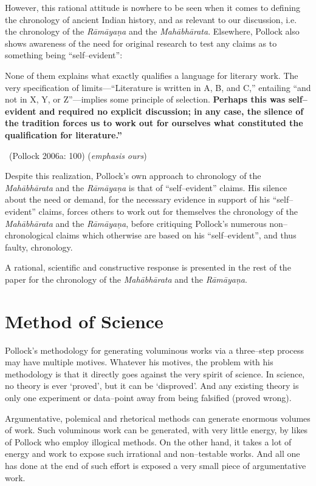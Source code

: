 However, this rational attitude is nowhere to be seen when it comes to defining the chronology of ancient Indian history, and as relevant to our discussion, i.e. the chronology of the \textit{Rāmāyaṇa} and the \textit{Mahābhārata}. Elsewhere, Pollock also shows awareness of the need for original research to test any claims as to something being “self–evident”:

\begin{myquote}
None of them explains what exactly qualiﬁes a language for literary work. The very speciﬁcation of limits—“Literature is written in A, B, and C,” entailing “and not in X, Y, or Z”—implies some principle of selection. \textbf{Perhaps this was self–evident and required no explicit discussion; in any case, the silence of the tradition forces us to work out for ourselves what constituted the qualiﬁcation for literature.”} 

~\hfill (Pollock 2006a: 100) (\textit{emphasis ours})
\end{myquote}

Despite this realization, Pollock’s own approach to chronology of the \textit{Mahābhārata} and the \textit{Rāmāyaṇa} is that of “self–evident” claims. His silence about the need or demand, for the necessary evidence in support of his “self–evident” claims, forces others to work out for themselves the chronology of the \textit{Mahābhārata} and the \textit{Rāmāyaṇa}, before critiquing Pollock’s numerous non–chronological claims which otherwise are based on his “self–evident”, and thus faulty, chronology.

A rational, scientific and constructive response is presented in the rest of the paper for the chronology of the \textit{Mahābhārata} and the \textit{Rāmāyaṇa}.


\section*{Method of Science}

Pollock’s methodology for generating voluminous works via a three–step process may have multiple motives. Whatever his motives, the problem with his methodology is that it directly goes against the very spirit of science. In science, no theory is ever ‘proved’, but it can be ‘disproved’. And any existing theory is only one experiment or data–point away from being falsified (proved wrong).

Argumentative, polemical and rhetorical methods can generate enormous volumes of work. Such voluminous work can be generated, with very little energy, by likes of Pollock who employ illogical methods. On the other hand, it takes a lot of energy and work to expose such irrational and non–testable works. And all one has done at the end of such effort is exposed a very small piece of argumentative work.

